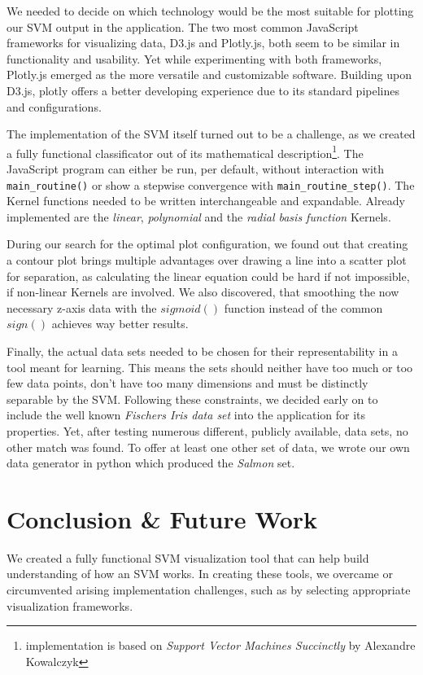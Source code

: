 \documentclass[parskip=half]{scrartcl}
\begin{document}
We needed to decide on which technology would be the most suitable for plotting our SVM output in the application. The two most common JavaScript frameworks for visualizing data, D3.js and Plotly.js, both seem to be similar in functionality and usability. Yet while experimenting with both frameworks, Plotly.js emerged as the more versatile and customizable software. Building upon D3.js, plotly offers a better developing experience due to its standard pipelines and configurations.

The implementation of the SVM itself turned out to be a challenge, as we created a fully functional classificator out of its mathematical description\footnote{implementation is based on \textit{Support Vector Machines Succinctly} by Alexandre Kowalczyk}. The JavaScript program can either be run, per default, without interaction with \verb|main_routine()| or show a stepwise convergence with \verb|main_routine_step()|. The Kernel functions needed to be written interchangeable and expandable. Already implemented are the \textit{linear}, \textit{polynomial} and the \textit{radial basis function} Kernels.

During our search for the optimal plot configuration, we found out that creating a contour plot brings multiple advantages over drawing a line into a scatter plot for separation, as calculating the linear equation could be hard if not impossible, if non-linear Kernels are involved. We also discovered, that smoothing the now necessary z-axis data with the $sigmoid()$ function instead of the common $sign()$ achieves way better results.

Finally, the actual data sets needed to be chosen for their representability in a tool meant for learning. This means the sets should neither have too much or too few data points, don't have too many dimensions and must be distinctly separable by the SVM. Following these constraints, we decided early on to include the well known \textit{Fischers Iris data set} into the application for its properties. Yet, after testing numerous different, publicly available, data sets, no other match was found. To offer at least one other set of data, we wrote our own data generator in python which produced the \textit{Salmon} set.

\section{Conclusion \& Future Work}

We created a fully functional SVM visualization tool
that can help build understanding of how an SVM works.
In creating these tools, we overcame or circumvented arising implementation challenges,
such as by selecting appropriate visualization frameworks.
\end{document}
